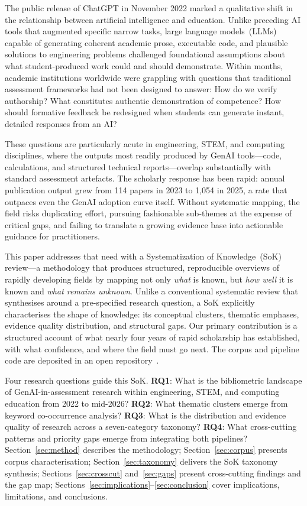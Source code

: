 \documentclass[conference]{IEEEtran}
\begin{document}
The public release of ChatGPT in November 2022 marked a qualitative shift in the relationship
between artificial intelligence and education. Unlike preceding AI tools that augmented
specific narrow tasks, large language models~(LLMs) capable of generating coherent academic
prose, executable code, and plausible solutions to engineering problems challenged foundational
assumptions about what student-produced work could and should demonstrate. Within months,
academic institutions worldwide were grappling with questions that traditional assessment
frameworks had not been designed to answer: How do we verify authorship? What constitutes
authentic demonstration of competence? How should formative feedback be redesigned when
students can generate instant, detailed responses from an AI?

These questions are particularly acute in engineering, STEM, and computing disciplines, where
the outputs most readily produced by GenAI tools---code, calculations, and structured technical
reports---overlap substantially with standard assessment artefacts. The scholarly response has
been rapid: annual publication output grew from 114 papers in 2023 to 1,054 in 2025, a rate
that outpaces even the GenAI adoption curve itself. Without systematic mapping, the field risks
duplicating effort, pursuing fashionable sub-themes at the expense of critical gaps, and failing
to translate a growing evidence base into actionable guidance for practitioners.

This paper addresses that need with a Systematization of Knowledge~(SoK) review---a methodology
that produces structured, reproducible overviews of rapidly developing fields by mapping not only
\textit{what} is known, but \textit{how well} it is known and \textit{what remains unknown}.
Unlike a conventional systematic review that synthesises around a pre-specified research question,
a SoK explicitly characterises the shape of knowledge: its conceptual clusters, thematic emphases,
evidence quality distribution, and structural gaps. Our primary contribution is a structured account
of what nearly four years of rapid scholarship has established, with what confidence, and where the
field must go next. The corpus and pipeline code are deposited in an open repository~\cite{sok_repo}.

Four research questions guide this SoK. \textbf{RQ1}: What is the bibliometric landscape of
GenAI-in-assessment research within engineering, STEM, and computing education from 2022 to
mid-2026? \textbf{RQ2}: What thematic clusters emerge from keyword co-occurrence analysis?
\textbf{RQ3}: What is the distribution and evidence quality of research across a seven-category
taxonomy? \textbf{RQ4}: What cross-cutting patterns and priority gaps emerge from integrating
both pipelines? Section~\ref{sec:method} describes the methodology; Section~\ref{sec:corpus}
presents corpus characterisation; Section~\ref{sec:taxonomy} delivers the SoK taxonomy synthesis;
Sections~\ref{sec:crosscut} and~\ref{sec:gaps} present cross-cutting findings and the gap map;
Sections~\ref{sec:implications}--\ref{sec:conclusion} cover implications, limitations, and
conclusions.
\end{document}
